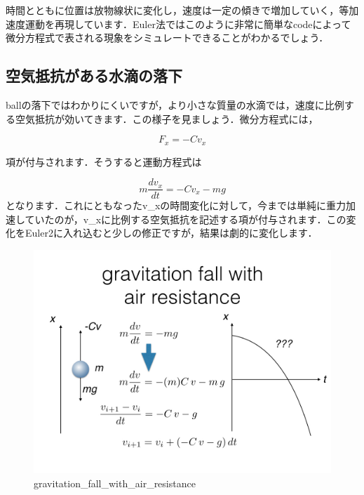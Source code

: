 \documentclass[11pt,dvipdfmx]{jsarticle}
\makeatletter
\def\maxwidth{\ifdim\Gin@nat@width>\linewidth\linewidth
    \else\Gin@nat@width\fi}
\let\Oldincludegraphics\includegraphics
\renewcommand{\includegraphics}[1]{\Oldincludegraphics[width=.8\maxwidth]{#1}}
\makeatother
\begin{document}
時間とともに位置は放物線状に変化し，速度は一定の傾きで増加していく，等加速度運動を再現しています．Euler法ではこのように非常に簡単なcodeによって微分方程式で表される現象をシミュレートできることがわかるでしょう．

    \subsection{空気抵抗がある水滴の落下}\label{ux7a7aux6c17ux62b5ux6297ux304cux3042ux308bux6c34ux6ef4ux306eux843dux4e0b}

ballの落下ではわかりにくいですが，より小さな質量の水滴では，速度に比例する空気抵抗が効いてきます．この様子を見ましょう．微分方程式には，

\[
F_x = - C v_x
\]

項が付与されます．そうすると運動方程式は

\[
m \frac{dv_x}{dt} = - C v_x - mg
\]
となります．これにともなったv\_xの時間変化に対して，今までは単純に重力加速していたのが，v\_xに比例する空気抵抗を記述する項が付与されます．この変化をEuler2に入れ込むと少しの修正ですが，結果は劇的に変化します．

\begin{figure}[htbp]
\centering
\includegraphics{../figs/ode.003.jpeg}
\caption{gravitation\_fall\_with\_air\_resistance}
\end{figure}
\end{document}
